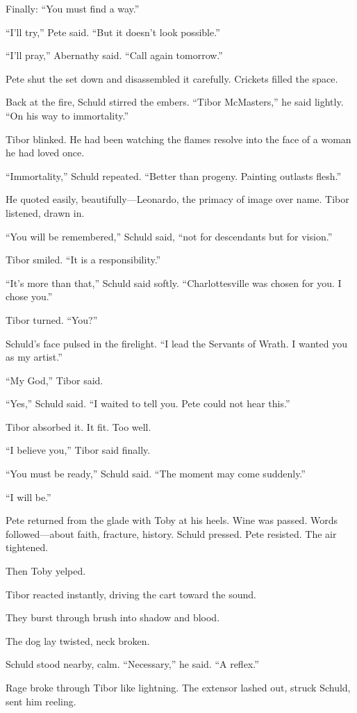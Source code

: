 Finally: “You must find a way.”

“I’ll try,” Pete said. “But it doesn’t look possible.”

“I’ll pray,” Abernathy said. “Call again tomorrow.”

Pete shut the set down and disassembled it carefully. Crickets filled the space.

Back at the fire, Schuld stirred the embers. “Tibor McMasters,” he said lightly. “On his way to immortality.”

Tibor blinked. He had been watching the flames resolve into the face of a woman he had loved once.

“Immortality,” Schuld repeated. “Better than progeny. Painting outlasts flesh.”

He quoted easily, beautifully—Leonardo, the primacy of image over name. Tibor listened, drawn in.

“You will be remembered,” Schuld said, “not for descendants but for vision.”

Tibor smiled. “It is a responsibility.”

“It’s more than that,” Schuld said softly. “Charlottesville was chosen for you. I chose you.”

Tibor turned. “You?”

Schuld’s face pulsed in the firelight. “I lead the Servants of Wrath. I wanted you as my artist.”

“My God,” Tibor said.

“Yes,” Schuld said. “I waited to tell you. Pete could not hear this.”

Tibor absorbed it. It fit. Too well.

“I believe you,” Tibor said finally.

“You must be ready,” Schuld said. “The moment may come suddenly.”

“I will be.”

Pete returned from the glade with Toby at his heels. Wine was passed. Words followed—about faith, fracture, history. Schuld pressed. Pete resisted. The air tightened.

Then Toby yelped.

Tibor reacted instantly, driving the cart toward the sound.

They burst through brush into shadow and blood.

The dog lay twisted, neck broken.

Schuld stood nearby, calm. “Necessary,” he said. “A reflex.”

Rage broke through Tibor like lightning. The extensor lashed out, struck Schuld, sent him reeling.

